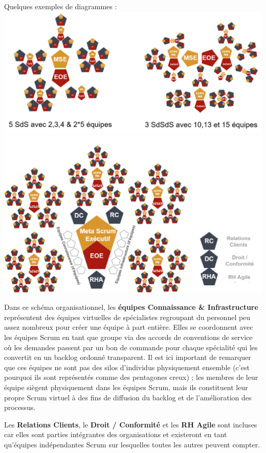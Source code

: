 \documentclass[12pt,a4paper,parskip=full]{scrartcl}
\begin{document}
Quelques exemples de diagrammes :
\includegraphics[width=1.0\linewidth]{VariantesSdS-R2.png}
\includegraphics[width=1.0\linewidth]{DiagrammeOrganisationnel.png}

Dans ce schéma organisationnel, les \textbf{équipes Connaissance & Infrastructure}
représentent des équipes virtuelles de spécialistes regroupant du personnel peu assez
nombreux pour créer une équipe à part entière. Elles se coordonnent avec les équipes
Scrum en tant que groupe via des accords de conventions de service où les demandes
passent par un bon de commande pour chaque spécialité qui les convertit en un backlog
ordonné transparent. Il est ici important de remarquer que ces équipes ne sont pas des
silos d'individus physiquement ensemble (c'est pourquoi ils sont représentés comme des
pentagones creux) ; les membres de leur équipe siègent physiquement dans les équipes
Scrum, mais ils constituent leur propre Scrum virtuel à des fins de diffusion du backlog et
de l'amélioration des processus.

Les \textbf{Relations Clients}, le \textbf{Droit / Conformité} et les \textbf{RH Agile} sont incluses car elles sont
parties intégrantes des organisations et existeront en tant qu'équipes indépendantes
Scrum sur lesquelles toutes les autres peuvent compter.
\end{document}
